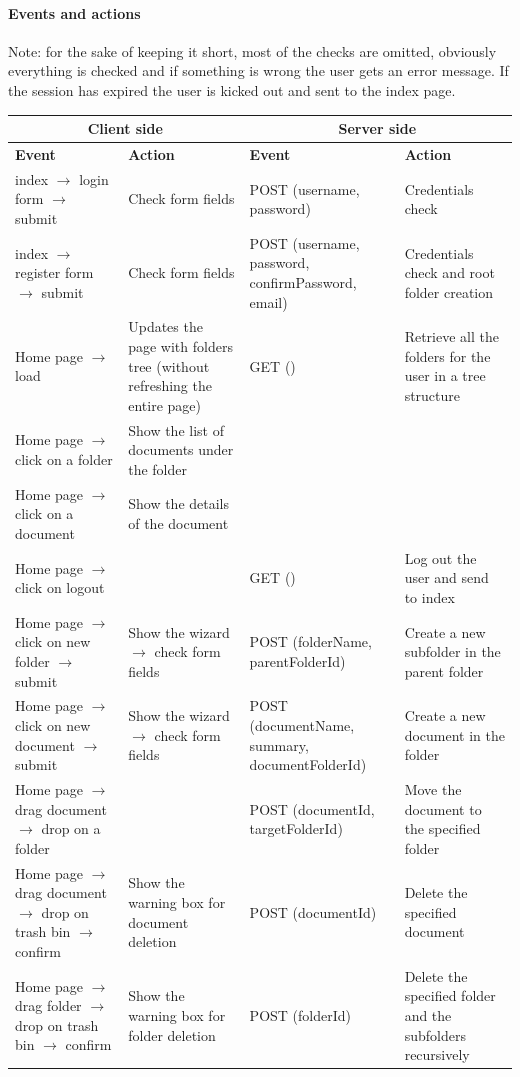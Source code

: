 \documentclass[a4paper,12pt]{article}
\begin{document}
\paragraph{Events and actions}
Note: for the sake of keeping it short, most of the checks are omitted, obviously everything is checked and if something is wrong the user gets an error message. If the session has expired the user is kicked out and sent to the index page.
\begin{center}
\begin{tabular}{|p{4cm}|p{4cm}|p{4cm}|p{4cm}|}
\hline

\multicolumn{2}{|c|}{\textbf{Client side}} & \multicolumn{2}{c|}{\textbf{Server side}}\\
\hline
\textbf{Event} & \textbf{Action} & \textbf{Event} & \textbf{Action} \\
\hline 
index $\rightarrow$ login form $\rightarrow$ submit & Check form fields & POST (username, password) & Credentials check \\
\hline 
index $\rightarrow$ register form $\rightarrow$ submit & Check form fields & POST (username, password, confirmPassword, email) & Credentials check and root folder creation\\
\hline  
Home page $\rightarrow$ load & Updates the page with folders tree (without refreshing the entire page) & GET () & Retrieve all the folders for the user in a tree structure\\
\hline
Home page $\rightarrow$ click on a folder & Show the list of documents under the folder & &\\
\hline
Home page $\rightarrow$ click on a document & Show the details of the document & &\\
\hline
Home page $\rightarrow$ click on logout & & GET () & Log out the user and send to index\\
\hline
Home page $\rightarrow$ click on new folder $\rightarrow$ submit & Show the wizard $\rightarrow$ check form fields & POST (folderName, parentFolderId) & Create a new subfolder in the parent folder\\
\hline
Home page $\rightarrow$ click on new document $\rightarrow$  submit & Show the wizard $\rightarrow$ check form fields & POST (documentName, summary, documentFolderId) & Create a new document in the folder\\
\hline
Home page $\rightarrow$  drag document $\rightarrow$  drop on a folder & & POST (documentId, targetFolderId) & Move the document to the specified folder\\
\hline
Home page $\rightarrow$ drag document $\rightarrow$ drop on trash bin $\rightarrow$ confirm & Show the warning box for document deletion & POST (documentId) & Delete the specified document\\
\hline
Home page $\rightarrow$ drag folder $\rightarrow$ drop on trash bin $\rightarrow$ confirm & Show the warning box for folder deletion & POST (folderId) & Delete the specified folder and the subfolders recursively\\
\hline
\end{tabular}
\end{center}
\newpage
\end{document}
